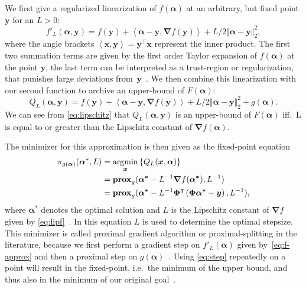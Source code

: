 We first give a regularized linearization of \(f(\bm{\alpha})\) at an arbitrary,
but fixed point \(\bm{y}\) for an \(L > 0\):
\begin{equation}\label{eq:f-approx}
  f'_L(\bm{\alpha}, \bm{y}) = f(\bm{y}) + \left< \bm{\alpha} - \bm{y}, \bm{\nabla} f (\bm{y}) \right> +
  L/2 \Vert \bm{\alpha} - \bm{y} \Vert_2^2,
\end{equation}
where the angle brackets \( \left< \bm{x}, \bm{y} \right> = \bm{y}^\intercal \bm{x} \) represent the inner product.
The first two summation terms are given by the first order Taylor expansion of \(f(\bm{\alpha})\) at the point \(\bm{y}\), the last term can be interpreted as a trust-region or regularization, that punishes large deviations from~\(\bm{y}\)~\cite{proxsurvey}.
We then combine this linearization with our second function to archive an upper-bound of \(F(\bm{\alpha})\):
\begin{equation}\label{eq:goal-approx}
  Q_L(\bm{\alpha}, \bm{y}) = f(\bm{y}) + \left< \bm{\alpha} - \bm{y}, \bm{\nabla} f (\bm{y}) \right> +
  L/2 \Vert \bm{\alpha} - \bm{y} \Vert_2^2 +
  g(\bm{\alpha}).
\end{equation}
We can see from \cref{eq:lipschitz} that \(Q_L(\bm{\alpha}, \bm{y})\) is an
upper-bound of \(F(\bm{\alpha})\) iff.~L is equal to or greater than the Lipschitz
constant of \(\bm{\nabla} f(\bm{\alpha})\).

The minimizer for this approximation is then given as the fixed-point equation
\begin{align}\label{eq:step}
  \pi_{g(\bm{\alpha})}(\bm{\alpha}^*, L) &=  \argmin_{\bm{x}} \left\{ Q_L(\bm{x}, \bm{\alpha}) \right\}\nonumber\\
       &= \prox[\(g\)]{\bm{\alpha^*} - L^{-1} \bm{\nabla} f (\bm{\alpha^*})}{L^{-1} } \nonumber\\
       &= \prox[\(g\)]{\bm{\alpha^*} - L^{-1} \bm{\Phi}^\intercal \left(\bm{\Phi} \bm{\alpha^*} - \bm{y} \right)}
         {L^{-1}},
\end{align}
where \(\bm{\alpha}^*\) denotes the optimal solution and \(L\) is the Lipschitz constant of \(\bm{\nabla} f\) given by \cref{eq:lipf}~\cite{fista}.
In this equation \(L\) is used to determine the optimal stepsize.
This minimizer is called proximal gradient algorithm or proximal-splitting in the literature, because we first perform a gradient step on \(f'_L(\bm{\alpha})\) given by~\ref{eq:f-approx} and then a proximal step on \(g(\bm{\alpha})\)~\cite{proxsurvey}.
Using \cref{eq:step} repeatedly on a point will result in the fixed-point, i.e.~the minimum of the upper bound, and thus also in the minimum of our original goal~\cite{proxsurvey}.

